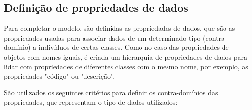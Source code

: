 \documentclass{article}
\begin{document}
\subsection{Definição de propriedades de dados}

Para completar o modelo, são definidas as propriedades de dados, que são as propriedades usadas para associar dados de um determinado tipo (contra-domínio) a indivíduos de certas classes. Como no caso das propriedades de objetos com nomes iguais, é criada um hierarquia de propriedades de dados para lidar com propriedades de diferentes classes com o mesmo nome, por exemplo, as propriedades "código" ou "descrição".


São utilizados os seguintes critérios para definir os contra-domínios das propriedades, que representam o tipo de dados utilizados:
\end{document}
